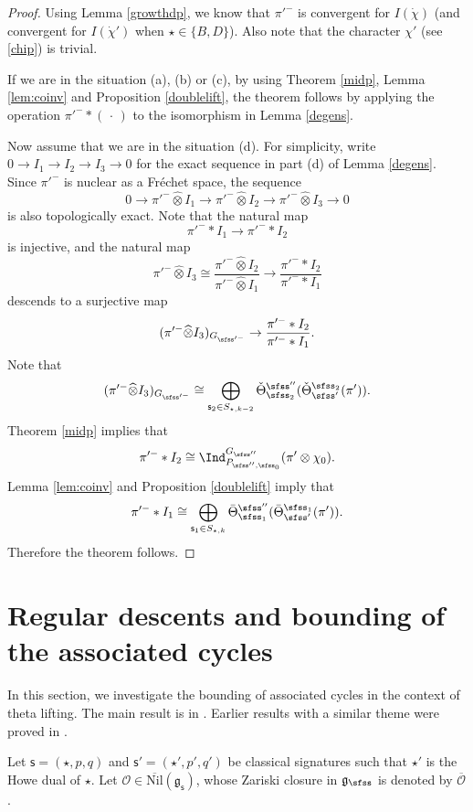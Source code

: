 \documentclass[11pt,a4paper]{amsart}
\newcommand{\CO}{{\mathcal {O}}}
\newcommand{\g}{\mathfrak g}
\numberwithin{equation}{section}
\theoremstyle{remark}
\def\Nil{\overline{\mathrm{Nil}}}
\def\Thetab{\bar{\Theta}}
\def\totimes{\widehat{\otimes}}
\begin{document}
\begin{proof}
Using Lemma \ref{growthdp}, we know that $\pi'^-$ is convergent for $I(\dot \chi)$ (and convergent for $I(\dot \chi')$ when $\star\in \{B,D\}$). Also note that the character $\chi'$ (see \eqref{chip}) is trivial.

If we are in the situation (a), (b) or (c), by using Theorem \ref{midp}, Lemma \ref{lem:coinv} and Proposition \ref{doublelift}, the theorem follows by applying the operation $\pi'^-*(\,\cdot\,)$ to the isomorphism in Lemma \ref{degens}.

Now assume that we are in the situation (d).
For simplicity, write $0\rightarrow I_1\rightarrow I_2\rightarrow I_3\rightarrow
0$ for the exact sequence in part (d) of Lemma \ref{degens}. Since $\pi'^-$ is nuclear as a Fr\'echet space, the sequence
\[
0\rightarrow \pi'^-\totimes I_1\rightarrow \pi'^-\totimes I_2\rightarrow \pi'^-\totimes I_3\rightarrow
0
\]
is also topologically exact.
Note that the natural map
\[
\pi'^- * I_1\rightarrow \pi'^- * I_2
\]
is injective, and the natural map
\[
  \pi'^-\totimes I_3\cong \frac{\pi'^-\totimes I_2}{\pi'^- \totimes I_1}\longrightarrow\frac{ \pi'^-*I_2}{\pi'^-*I_1}
  \]
descends to a surjective map
\[
  (\pi'^-\totimes  I_3)_{G_{\sfss'^-}}\rightarrow \frac{ \pi'^-*I_2}{\pi'^-*I_1}.
\]
Note that
\[
   (\pi'^-\totimes  I_3)_{G_{\sfss'^-}}\cong \bigoplus_{\mathsf s_2\in S_{\star, k-2}} \check \Theta^{\sfss''}_{\sfss_2}(\check \Theta^{\sfss_2}_{\sfss'}(\pi')).
\]
Theorem \ref{midp} implies that
\[
\pi'^-*I_2\cong \Ind_{P_{\sfss'',\sfss_0}}^{G_{\sfss''}} (\pi'\otimes \chi_0).
\]
Lemma \ref{lem:coinv} and Proposition \ref{doublelift} imply that
\[
\pi'^-*I_1\cong  \bigoplus_{\mathsf s_1\in S_{\star, k} } \Thetab^{\sfss''}_{\sfss_1}(\Thetab^{\sfss_1}_{\sfss'}(\pi')).
\]
Therefore the theorem follows.
\end{proof}

\section{Regular descents and bounding of the associated cycles}\label{sec:AC}

In this section, we investigate the bounding of associated cycles in the context of theta lifting. The main result is in . Earlier results with a similar theme were proved in \cites{NOT, NZ, LM}.

Let $\mathsf s=(\star, p,q)$ and $ \mathsf s'=(\star', p',q')$ be classical signatures such that $\star'$ is the Howe dual of $\star$.
Let $\CO\in \Nil(\g_\mathsf s)$, whose Zariski closure in $\g_\sfss$ is denoted by $\overline \CO$.
\end{document}
